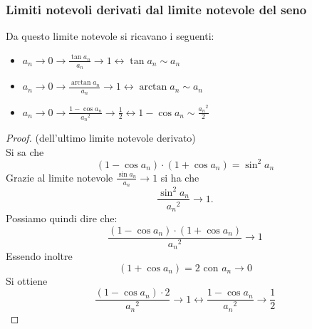 \documentclass[a4paper,12pt, oneside]{book}
\begin{document}
\subsubsection{Limiti notevoli derivati dal limite notevole del seno} Da questo
limite notevole si ricavano i seguenti:
\begin{itemize}
  \item $a_n\rightarrow 0 \longrightarrow \frac{\tan{a_n}}{a_n}\rightarrow 1
  \longleftrightarrow \tan{a_n}\sim a_n$
  \item $a_n\rightarrow 0 \longrightarrow \frac{\arctan{a_n}}{a_n}\rightarrow 1
  \longleftrightarrow \arctan{a_n}\sim a_n$
  \item $a_n\rightarrow 0 \longrightarrow
  \frac{1-\cos{a_n}}{{a_n}^{2}}\rightarrow \frac{1}{2} \longleftrightarrow
  1-\cos{a_n}\sim \frac{{a_n}^{2}}{2}$
\end{itemize}
\begin{proof}(dell'ultimo limite notevole derivato)\\ Si sa
  che $$(1-\cos{a_n})\cdot(1+\cos{a_n})=\sin^2{a_n}$$ Grazie al limite notevole
  $\frac{\sin{a_n}}{a_n} \rightarrow 1$ si ha che $$\frac{\sin^2{a_n}}{{a_n}^{2}}
  \rightarrow 1.$$ Possiamo quindi dire
  che: $$\frac{(1-\cos{a_n})\cdot(1+\cos{a_n})}{{a_n}^{2}}\rightarrow 1$$ Essendo
  inoltre $$(1+\cos{a_n})=2 \mbox{ con } a_n\rightarrow 0$$ Si
  ottiene $$\frac{(1-\cos{a_n})\cdot 2}{{a_n}^{2}}\rightarrow 1
  \longleftrightarrow \frac{1-\cos{a_n}}{{a_n}^{2}}\rightarrow \frac{1}{2} $$
\end{proof}
\end{document}
